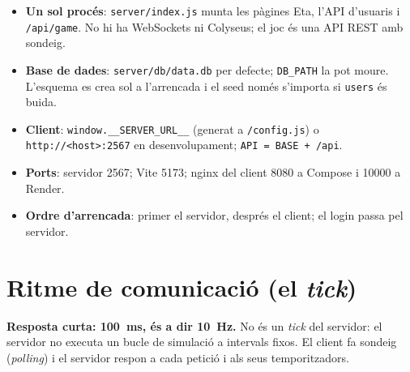 \documentclass[10pt,a4paper]{article}
\begin{document}
\begin{itemize}[nosep]
  \item \textbf{Un sol procés}: \texttt{server/index.js} munta les pàgines Eta, l'API
        d'usuaris i \texttt{/api/game}. No hi ha WebSockets ni Colyseus; el joc és una
        API REST amb sondeig.
  \item \textbf{Base de dades}: \texttt{server/db/data.db} per defecte;
        \texttt{DB\_PATH} la pot moure. L'esquema es crea sol a l'arrencada i el seed
        només s'importa si \texttt{users} és buida.
  \item \textbf{Client}: \texttt{window.\_\_SERVER\_URL\_\_} (generat a
        \texttt{/config.js}) o \texttt{http://<host>:2567} en desenvolupament;
        \texttt{API = BASE + /api}.
  \item \textbf{Ports}: servidor 2567; Vite 5173; nginx del client 8080 a Compose i
        10000 a Render.
  \item \textbf{Ordre d'arrencada}: primer el servidor, després el client; el login
        passa pel servidor.
\end{itemize}

\section{Ritme de comunicació (el \emph{tick})}

\textbf{Resposta curta: 100~ms, és a dir 10~Hz.} No és un \emph{tick} del servidor:
el servidor no executa un bucle de simulació a intervals fixos. El client fa sondeig
(\emph{polling}) i el servidor respon a cada petició i als seus temporitzadors.
\end{document}
